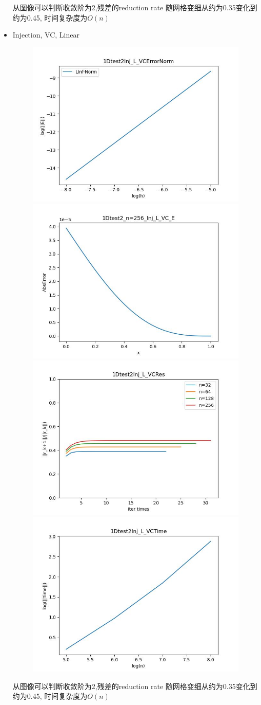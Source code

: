 \documentclass{article}
\begin{document}
\begin{itemize}
    从图像可以判断收敛阶为2,残差的reduction rate 随网格变细从约为0.35变化到约为0.45, 时间复杂度为$O(n)$
    \newpage
    \item Injection, VC, Linear
    \begin{figure}[h]
        \centering
        \includegraphics[width=0.35\linewidth]{1Dtest2Inj_L_VCErrorNorm.jpg}
        \includegraphics[width=0.35\linewidth]{1Dtest2_n=256_Inj_L_VC_E.jpg}
        \includegraphics[width=0.35\linewidth]{1Dtest2Inj_L_VCRes.jpg}
        \includegraphics[width=0.35\linewidth]{1Dtest2Inj_L_VCTime.jpg}
    \end{figure}
    
    从图像可以判断收敛阶为2,残差的reduction rate 随网格变细从约为0.35变化到约为0.45, 时间复杂度为$O(n)$
    

\end{itemize}
\end{document}
